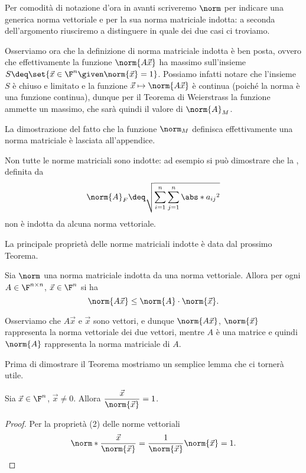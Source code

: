 Per comodità di notazione d'ora in avanti scriveremo $\norm$ per indicare una generica norma vettoriale e per la sua norma matriciale indotta: a seconda dell'argomento riusciremo a distinguere in quale dei due casi ci troviamo.

Osserviamo ora che la definizione di norma matriciale indotta è ben posta, ovvero che effettivamente la funzione $\norm{A\vec x}$ ha massimo sull'insieme $S \deq \set{\vec x \in \F^n \given \norm{\vec x} = 1}$. 
Possiamo infatti notare che l'insieme $S$ è chiuso e limitato e la funzione $\vec x \mapsto \norm{A\vec x}$ è continua (poiché la norma è una funzione continua), dunque per il Teorema di Weierstrass la funzione ammette un massimo, che sarà quindi il valore di $\norm{A}_M$.

La dimostrazione del fatto che la funzione $\norm_M$ definisca effettivamente una norma matriciale è lasciata all'appendice.

\begin{remark}
    Non tutte le norme matriciali sono indotte: ad esempio si può dimostrare che la , definita da \[
        \norm{A}_F \deq \sqrt{\sum_{i=1}^n\sum_{j=1}^n \abs*{a_{ij}}^2}
    \] non è indotta da alcuna norma vettoriale.
\end{remark}

La principale proprietà delle norme matriciali indotte è data dal prossimo Teorema.
\begin{theorem}
    \label{th:comp_matrix_norm}
    Sia $\norm$ una norma matriciale indotta da una norma vettoriale. Allora per ogni $A \in \Mat{\F, n, n}$, $\vec x \in \F^n$ si ha \[
        \norm{A\vec x} \leq \norm{A} \cdot \norm{\vec x}.
    \] 
\end{theorem}

Osserviamo che $A\vec x$ e $\vec x$ sono vettori, e dunque $\norm{A\vec x}$, $\norm{\vec x}$ rappresenta la norma vettoriale dei due vettori, mentre $A$ è una matrice e quindi $\norm{A}$ rappresenta la norma matriciale di $A$. 

Prima di dimostrare il Teorema mostriamo un semplice lemma che ci tornerà utile.
\begin{lemma}
    \label{lem:vec_over_norm}
    Sia $\vec x \in \F^n$, $\vec x \neq 0$. Allora $\dfrac{\vec x}{\norm{\vec x}} = 1$.  
\end{lemma}
\begin{proof}
    Per la proprietà (2) delle norme vettoriali \[
        \norm*{\frac{\vec x}{\norm{\vec x}}} = \frac1{\norm{\vec x}} \norm{\vec x} = 1. \qedhere
    \]
\end{proof}

